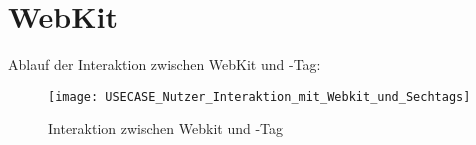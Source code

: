 \author{Gottfried von Recum}

\section{WebKit}

Ablauf der Interaktion zwischen WebKit und \SEARCH-Tag:
\begin{figure}[ht]
    \centering
    \texttt{[image: USECASE\_Nutzer\_Interaktion\_mit\_Webkit\_und\_Sechtags]}
    \caption{Interaktion zwischen Webkit und \SEARCH-Tag}
    \label{fig:Webkit Use Case}
\end{figure}
\pagebreak